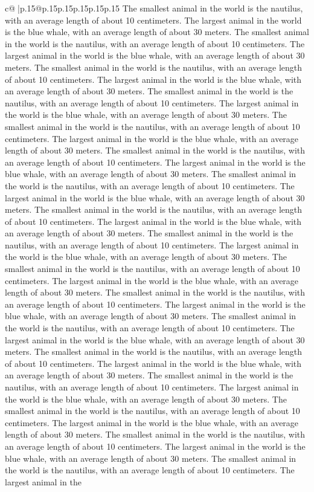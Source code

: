 \documentclass{article}
\begin{document}
{\begin{supertabular}{c@{$\;$}|p{.15\linewidth}@{}p{.15\linewidth}p{.15\linewidth}p{.15\linewidth}p{.15\linewidth}p{.15\linewidth}}
{{{The smallest animal in the world is the nautilus, with an average length of about 10 centimeters. The largest animal in the world is the blue whale, with an average length of about 30 meters. The smallest animal in the world is the nautilus, with an average length of about 10 centimeters. The largest animal in the world is the blue whale, with an average length of about 30 meters. The smallest animal in the world is the nautilus, with an average length of about 10 centimeters. The largest animal in the world is the blue whale, with an average length of about 30 meters. The smallest animal in the world is the nautilus, with an average length of about 10 centimeters. The largest animal in the world is the blue whale, with an average length of about 30 meters. The smallest animal in the world is the nautilus, with an average length of about 10 centimeters. The largest animal in the world is the blue whale, with an average length of about 30 meters. The smallest animal in the world is the nautilus, with an average length of about 10 centimeters. The largest animal in the world is the blue whale, with an average length of about 30 meters. The smallest animal in the world is the nautilus, with an average length of about 10 centimeters. The largest animal in the world is the blue whale, with an average length of about 30 meters. The smallest animal in the world is the nautilus, with an average length of about 10 centimeters. The largest animal in the world is the blue whale, with an average length of about 30 meters. The smallest animal in the world is the nautilus, with an average length of about 10 centimeters. The largest animal in the world is the blue whale, with an average length of about 30 meters. The smallest animal in the world is the nautilus, with an average length of about 10 centimeters. The largest animal in the world is the blue whale, with an average length of about 30 meters. The smallest animal in the world is the nautilus, with an average length of about 10 centimeters. The largest animal in the world is the blue whale, with an average length of about 30 meters. The smallest animal in the world is the nautilus, with an average length of about 10 centimeters. The largest animal in the world is the blue whale, with an average length of about 30 meters. The smallest animal in the world is the nautilus, with an average length of about 10 centimeters. The largest animal in the world is the blue whale, with an average length of about 30 meters. The smallest animal in the world is the nautilus, with an average length of about 10 centimeters. The largest animal in the world is the blue whale, with an average length of about 30 meters. The smallest animal in the world is the nautilus, with an average length of about 10 centimeters. The largest animal in the world is the blue whale, with an average length of about 30 meters. The smallest animal in the world is the nautilus, with an average length of about 10 centimeters. The largest animal in the world is the blue whale, with an average length of about 30 meters. The smallest animal in the world is the nautilus, with an average length of about 10 centimeters. The largest animal in the }}}
\end{supertabular}}
\end{document}
